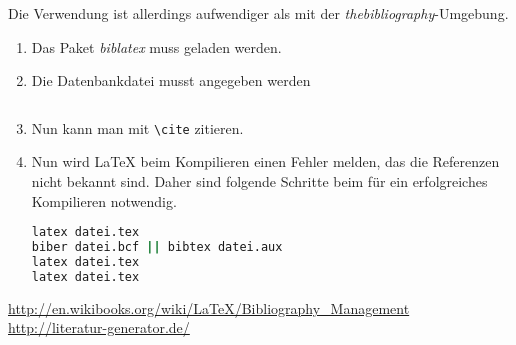 \documentclass[a4paper]{article}
\begin{document}
Die Verwendung ist allerdings aufwendiger als mit der
\emph{thebibliography}-Umgebung.
\begin{enumerate}
	\item Das Paket \emph{biblatex} muss geladen werden.
	\item Die Datenbankdatei musst angegeben werden
		\begin{lstlisting}

		\end{lstlisting}
	\item Nun kann man mit \verb+\cite+ zitieren.
	\item Nun wird \LaTeX{} beim Kompilieren einen Fehler melden, das die Referenzen nicht bekannt sind. Daher sind folgende Schritte beim für ein erfolgreiches Kompilieren notwendig.
		\begin{lstlisting}[language=sh, morekeywords={latex,biber}]
latex datei.tex
biber datei.bcf || bibtex datei.aux
latex datei.tex
latex datei.tex
		\end{lstlisting}
\end{enumerate}
\cite{greenwade93}

\printbibliography

\url{http://en.wikibooks.org/wiki/LaTeX/Bibliography_Management}
\url{http://literatur-generator.de/}
\end{document}
